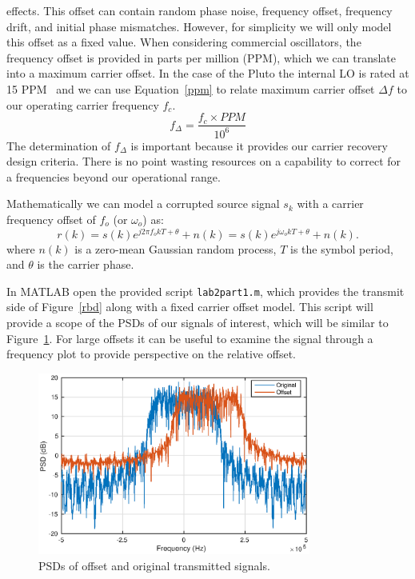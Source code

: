 \documentclass[letterpaper,12pt]{article}
\begin{document}
effects.  This offset can contain random phase noise, frequency offset, frequency drift, and initial phase 
mismatches.  However, for simplicity we will only model this offset as a fixed value.  When considering 
commercial oscillators, the frequency offset is provided in parts per million (PPM), which we can translate 
into a maximum carrier offset.  In the case of the Pluto the internal LO is rated at 15 PPM~\cite{ad9364} and 
we can use Equation~\eqref{ppm} to relate maximum carrier offset $\Delta f$ to our operating carrier frequency 
$f_c$.
%
\begin{equation}\label{ppm}
 f_{\Delta} = \frac{f_c \times PPM}{10^6}
\end{equation}
%
The determination of $f_{\Delta}$ is important because it provides our carrier recovery design criteria.  
There is no point wasting resources on a capability to correct for a frequencies beyond our operational 
range.\par 
%
Mathematically we can model a corrupted source signal $s_k$ with a carrier frequency offset of $f_o$ (or 
$\omega_o$) as:
%
\begin{equation}
  r(k) = s(k) e^{j 2 \pi f_o k T + \theta} + n(k) = s(k) e^{j \omega_o k T + \theta} + n(k).
\end{equation}
%
where $n(k)$ is a zero-mean Gaussian random process, $T$ is the symbol period, and $\theta$ is the carrier 
phase.\par
%
In MATLAB open the provided script \texttt{lab2part1.m}, which provides the transmit side of 
Figure~\ref{rbd} along with a fixed carrier offset model.  This script will provide a scope of the 
PSDs of our signals of interest, which will be similar to Figure~\ref{fig:freq_offset}.  For large offsets it can be useful to examine the signal through a frequency plot to provide perspective on the relative offset.

%
\begin{figure}[!htp]
 \centering
  \includegraphics[width=0.8\textwidth]{freqOffset.eps}
  \caption{PSDs of offset and original transmitted signals.}\label{fig:freq_offset}
\end{figure}
\end{document}
